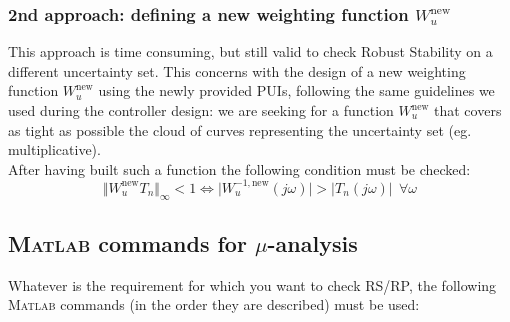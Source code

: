 \documentclass[a4paper, 12pt]{article}
\begin{document}
\subsubsection{2nd approach: defining a new weighting function $W_u^{\text{new}}$}
This approach is time consuming, but still valid to check Robust Stability on a different uncertainty set. This concerns with the design of a new weighting function $W_u^{\text{new}}$ using the newly provided PUIs, following the same guidelines we used during the controller design: we are seeking for a function $W_u^{\text{new}}$ that covers as tight as possible the cloud of curves representing the uncertainty set (eg. multiplicative).\\
After having built such a function the following condition must be checked: 
\begin{equation}
    \Vert W_u^{\text{new}} T_n \Vert_\infty < 1 \iff 
    \vert W_u^{-1,\text{new}}(j\omega) \vert > \vert T_n (j\omega)\vert \ \  \forall \omega
\end{equation}

\subsection{\textsc{Matlab} commands for $\mu$-analysis}
Whatever is the requirement for which you want to check RS/RP, the following \textsc{Matlab} commands (in the order they are described) must be used: 
\end{document}
